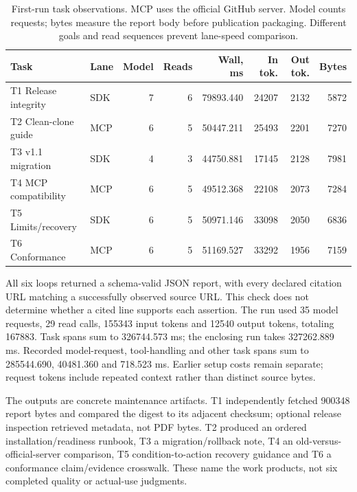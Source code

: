 \documentclass[11pt,letterpaper]{article}
\begin{document}
\begin{table}[tbp]
\centering\small
\begin{tabular}{@{}L{.22\linewidth}lrrrrrr@{}}
\toprule Task & Lane & Model & Reads & Wall, ms & In tok. & Out tok. & Bytes \\
\midrule
T1 Release integrity & SDK & 7 & 6 & 79893.440 & 24207 & 2132 & 5872 \\
T2 Clean-clone guide & MCP & 6 & 5 & 50447.211 & 25493 & 2201 & 7270 \\
T3 v1.1 migration & SDK & 4 & 3 & 44750.881 & 17145 & 2128 & 7981 \\
T4 MCP compatibility & MCP & 6 & 5 & 49512.368 & 22108 & 2073 & 7284 \\
T5 Limits/recovery & SDK & 6 & 5 & 50971.146 & 33098 & 2050 & 6836 \\
T6 Conformance & MCP & 6 & 5 & 51169.527 & 33292 & 1956 & 7159 \\
\bottomrule
\end{tabular}
\caption{First-run task observations. MCP uses the official GitHub server.
Model counts requests; bytes measure the report body before publication
packaging. Different goals and read sequences prevent lane-speed comparison.}
\label{tab:field-first}
\end{table}

All six loops returned a schema-valid JSON report, with every declared citation
URL matching a successfully observed source URL. This check does not determine
whether a cited line supports each assertion. The run used 35 model requests,
29 read calls, 155343 input tokens and 12540 output tokens, totaling 167883.
Task spans sum to 326744.573 ms; the enclosing run takes 327262.889 ms.
Recorded model-request, tool-handling and other task spans sum to 285544.690,
40481.360 and 718.523 ms. Earlier setup costs remain separate; request tokens
include repeated context rather than distinct source bytes.

The outputs are concrete maintenance artifacts. T1 independently fetched
900348 report bytes and compared the digest to its adjacent checksum; optional
release inspection retrieved metadata, not PDF bytes. T2 produced an ordered
installation/readiness runbook, T3 a migration/rollback note, T4 an old-versus-
official-server comparison, T5 condition-to-action recovery guidance and T6 a
conformance claim/evidence crosswalk. These name the work products, not six
completed quality or actual-use judgments.
\end{document}
